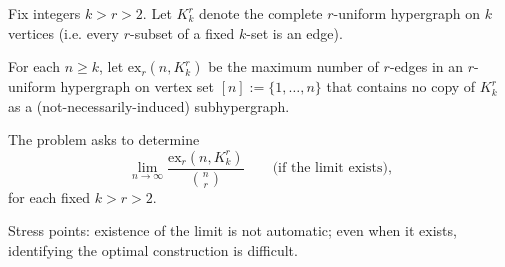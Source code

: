 Fix integers $k>r>2$. Let $K_k^r$ denote the complete $r$-uniform hypergraph on $k$ vertices (i.e. every $r$-subset of a fixed $k$-set is an edge).

For each $n\ge k$, let $\mathrm{ex}_r(n,K_k^r)$ be the maximum number of $r$-edges in an $r$-uniform hypergraph on vertex set $[n]:=\{1,\dots,n\}$ that contains no copy of $K_k^r$ as a (not-necessarily-induced) subhypergraph.

The problem asks to determine
\[
\lim_{n\to\infty}\frac{\mathrm{ex}_r(n,K_k^r)}{\binom{n}{r}}\qquad\text{(if the limit exists),}
\]
for each fixed $k>r>2$.

Stress points: existence of the limit is not automatic; even when it exists, identifying the optimal construction is difficult.
